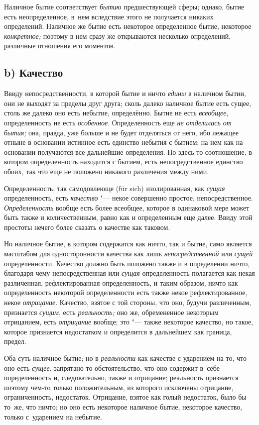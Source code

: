 Наличное бытие соответствует {\em бытию} предшествующей сферы; однако, бытие
есть неопределенное, в~нем вследствие этого не получается никаких определений.
Наличное же бытие есть некоторое определенное бытие, некоторое
{\em конкретное;} поэтому в нем сразу же открываются несколько определений,
различные отношения его моментов.

\subsection[b) Качество]{b) Качество}

Ввиду непосредственности, в которой бытие и ничто
{\em едины} в наличном бытии, они не выходят за пределы
друг друга; сколь далеко наличное бытие есть сущее, столь же далеко оно
есть небытие, определённо. Бытие не есть {\em всеобщее},
определенность не есть {\em особенное}. Определенность
еще {\em не отделилась от бытия;} она, правда, уже
больше и не будет отделяться от него, ибо лежащее отныне в основании
истинное есть единство небытия с бытием; на нем как на основании получаются
все дальнейшие определения. Но здесь то соотношение, в котором
определенность находится с бытием, есть непосредственное единство обоих,
так что еще не положено никакого различения между ними.

Определенность, так самодовлеюще (für sich) изолированная, как
{\em сущая} определенность, есть
{\em качество} "--- некое совершенно простое,
непосредственное. {\em Определенность} вообще есть
более всеобщее, которое в одинаковой мере может быть также и
количественным, равно как и определенным еще далее. Ввиду этой простоты
нечего более сказать о качестве как таковом.

Но наличное бытие, в котором содержатся как ничто, так и бытие, само
является масштабом для односторонности качества как лишь
{\em непосредственной} или {\em сущей} определенности. Качество должно быть
положено также и в определении ничто, благодаря чему непосредственная или
{\em сущая} определенность полагается как некая
различенная, рефлектированная определенность, и таким образом, ничто как
определенность некоторой определенности есть также некое рефлектированное,
некое {\em отрицание}. Качество, взятое с той стороны,
что оно, будучи различенным, признается {\em сущим},
есть {\em реальность;} оно же, обремененное некоторым
отрицанием, есть {\em отрицание} вообще; это "--- также
некоторое качество, но такое, которое признается недостатком и определится
в дальнейшем как граница, предел.

Оба суть наличное бытие; но в {\em реальности} как качестве с ударением на то,
что оно есть {\em сущее}, запрятано то обстоятельство, что оно содержит в~себе
определенность и, следовательно, также и отрицание; реальность признается
поэтому чем-то только положительным, из которого исключены отрицание,
ограниченность, недостаток. Отрицание, взятое как голый недостаток, было бы
то~же, что ничто; но оно есть некоторое наличное бытие, некоторое качество,
только с~ударением на небытие.

